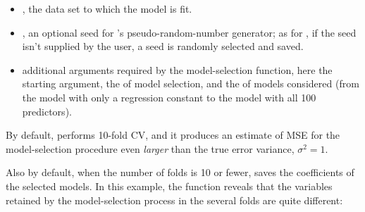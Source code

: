 \documentclass[
]{jss}
\providecommand{\tightlist}{%
  \setlength{\itemsep}{0pt}\setlength{\parskip}{0pt}}
\begin{document}
\begin{itemize}
\tightlist
\item
  , the data set to which the model is fit.
\item
  , an optional seed for 's pseudo-random-number
  generator; as for , if the seed isn't supplied by the user,
  a seed is randomly selected and saved.
\item
  additional arguments required by the model-selection function, here
  the starting  argument, the  of model
  selection, and the  of models considered (from the model
  with only a regression constant to the model with all 100 predictors).
\end{itemize}

By default,  performs 10-fold CV, and it produces an
estimate of MSE for the model-selection procedure even \emph{larger}
than the true error variance, \(\sigma^2 = 1\).

Also by default, when the number of folds is 10 or fewer,
 saves the coefficients of the selected models. In this
example, the  function reveals that the variables
retained by the model-selection process in the several folds are quite
different:
\end{document}
